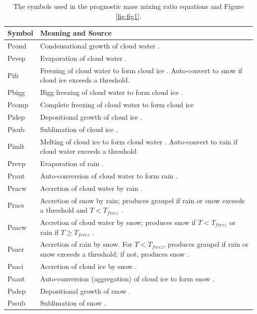 \documentclass[letterpaper,titlepage,10pt]{article}
\numberwithin{equation}{section}
\begin{document}
\begin{table}[!h]
\caption{The symbols used in the prognostic mass mixing ratio equations and Figure \ref{fig:fig1}.}
\label{tab:tab1p}
\begin{tabular}{p{}p{}}
\hline
Symbol	&	Meaning and Source	\\
\hline
Pcond	&	Condensational growth of cloud water \citep{hong2006thew}.	\\
Pevep	&	Evaporation of cloud water \citep{hong2006thew}.	\\
Pifr	&	Freezing of cloud water to form cloud ice \citep{lin1983bulk, hong2006thew}. Auto-convert to snow if cloud ice exceeds a threshold.	\\
Pbigg	&	Bigg freezing of cloud water to form cloud ice \citep{bigg1953thes}.	\\
Pcomp	&	Complete freezing of cloud water to form cloud ice \citep{lin1983bulk, hong2006thew} \\
Pidep	&	Depositional growth of cloud ice \citep{hong2004arev}.	\\
Pisub	&	Sublimation of cloud ice \citep{hong2004arev}.	\\
Pimlt	&	Melting of cloud ice to form cloud water \citep{lin1983bulk}. Auto-convert to rain if cloud water exceeds a threshold.	\\
Prevp	&	Evaporation of rain \citep{lin1983bulk}.	\\
Praut	&	Auto-conversion of cloud water to form rain \citep{hong2004arev}.	\\
Pracw	&	Accretion of cloud water by rain \citep{lin1983bulk}.	\\
Pracs	&	Accretion of snow by rain; produces graupel if rain or snow exceeds a threshold and $T < T_{freez}$ \citep{lin1983bulk}.	\\
Psacw	&	Accretion of cloud water by snow; produces snow if $T < T_{freez}$ or rain if $T \geq T_{freez}$ \citep{lin1983bulk}.	\\
Psacr	&	Accretion of rain by snow. For $T < T_{freez}$, produces graupel if rain or snow exceeds a threshold; if not, produces snow \citep{lin1983bulk}.	\\
Psaci	&	Accretion of cloud ice by snow \citep{lin1983bulk}.	\\
Psaut	&	Auto-conversion (aggregation) of cloud ice to form snow \citep{lin1983bulk}.	\\
Psdep	&	Depositional growth of snow \citep{lin1983bulk}.	\\
Pssub	&	Sublimation of snow \citep{lin1983bulk}.	\\

\end{tabular}
\end{table}
\end{document}
